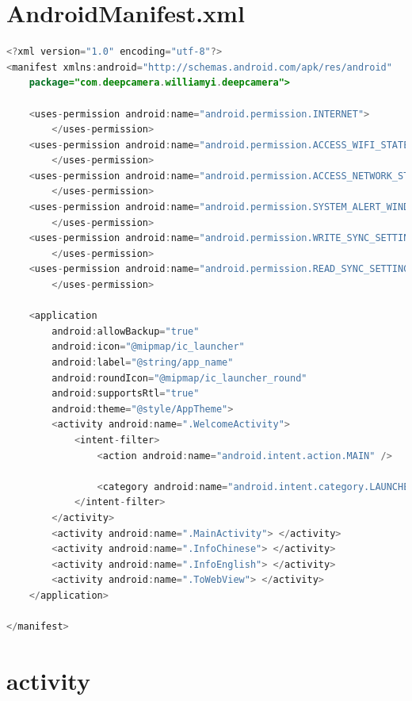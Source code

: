 \documentclass[UTF8, Microsoft YaHei]{book}
\begin{document}
    \section{AndroidManifest.xml}
\begin{small}
\begin{lstlisting}[language=java]
<?xml version="1.0" encoding="utf-8"?>
<manifest xmlns:android="http://schemas.android.com/apk/res/android"
    package="com.deepcamera.williamyi.deepcamera">

    <uses-permission android:name="android.permission.INTERNET">
    	</uses-permission>
    <uses-permission android:name="android.permission.ACCESS_WIFI_STATE">
    	</uses-permission>
    <uses-permission android:name="android.permission.ACCESS_NETWORK_STATE">
    	</uses-permission>
    <uses-permission android:name="android.permission.SYSTEM_ALERT_WINDOW">
    	</uses-permission>
    <uses-permission android:name="android.permission.WRITE_SYNC_SETTINGS">
    	</uses-permission>
    <uses-permission android:name="android.permission.READ_SYNC_SETTINGS">
    	</uses-permission>

    <application
        android:allowBackup="true"
        android:icon="@mipmap/ic_launcher"
        android:label="@string/app_name"
        android:roundIcon="@mipmap/ic_launcher_round"
        android:supportsRtl="true"
        android:theme="@style/AppTheme">
        <activity android:name=".WelcomeActivity">
            <intent-filter>
                <action android:name="android.intent.action.MAIN" />

                <category android:name="android.intent.category.LAUNCHER" />
            </intent-filter>
        </activity>
        <activity android:name=".MainActivity"> </activity>
        <activity android:name=".InfoChinese"> </activity>
        <activity android:name=".InfoEnglish"> </activity>
        <activity android:name=".ToWebView"> </activity>
    </application>

</manifest>
\end{lstlisting}
\end{small}
    \section{activity}
\end{document}
